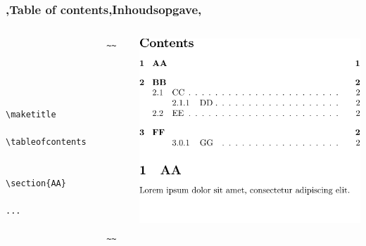 
\unless\ifishandout
\begin{frame}[fragile]
    \frametitle{\lang,Table of contents,Inhoudsopgave,}
    
    \begin{columns}
        \begin{column}{0.5\textwidth}
            \begin{codebox}
                \begin{verbatim}
                    ~~


                    
                        \maketitle
                        \tableofcontents
            
                        \section{AA}
                        ...
                    
                    ~~
                \end{verbatim}
            \end{codebox}
        \end{column}
        \begin{column}{0.5\textwidth}
            \includegraphics[width=\linewidth,height=0.8\textheight,keepaspectratio,page=1]{assets/tableofcontents.pdf}
            \vspace{-60pt}
        \end{column}
    \end{columns}
\end{frame}

